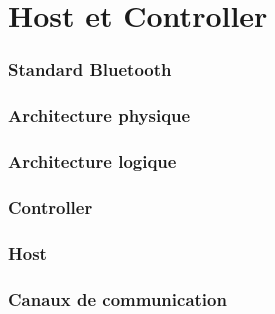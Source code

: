 \section{Host et Controller}

\begin{frame}
	\frametitle{Standard Bluetooth}
\end{frame}

\begin{frame}
	\frametitle{Architecture physique}
\end{frame}

\begin{frame}
	\frametitle{Architecture logique}
\end{frame}

\begin{frame}
	\frametitle{Controller}
\end{frame}

\begin{frame}
	\frametitle{Host}
\end{frame}

\begin{frame}
	\frametitle{Canaux de communication}
\end{frame}

